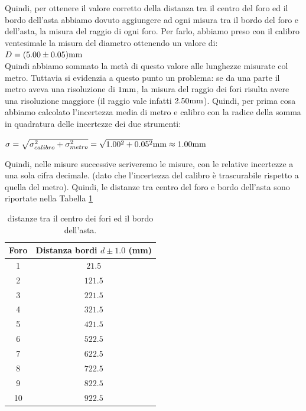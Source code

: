 \documentclass[a4paper,12pt]{article}
\begin{document}
Quindi, per ottenere il valore corretto della distanza tra il centro del foro ed il bordo dell'asta abbiamo dovuto aggiungere ad ogni misura tra il bordo del foro e dell'asta, la misura del raggio di ogni foro. Per farlo, abbiamo preso con il calibro ventesimale la misura del diametro ottenendo un valore di:\\
$D=(5.00\pm0.05)\rm mm$\\
Quindi abbiamo sommato la metà di questo valore alle lunghezze misurate col metro. Tuttavia si evidenzia a questo punto un problema: se da una parte il metro aveva una risoluzione di $1\rm mm$, la misura del raggio dei fori risulta avere una risoluzione maggiore (il raggio vale infatti $2.50\rm mm$). Quindi, per prima cosa abbiamo calcolato l'incertezza media di metro e calibro con la radice della somma in quadratura delle incertezze dei due strumenti:
\begin{center}
    $\sigma =\sqrt{\sigma_{calibro}^2+\sigma_{metro}^2}=\sqrt{1.00^2+0.05^2}\rm mm\approx1.00mm$
\end{center}
Quindi, nelle misure successive scriveremo le misure, con le relative incertezze a una sola cifra decimale. (dato che l'incertezza del calibro è trascurabile rispetto a quella del metro).
Quindi, le distanze tra centro del foro e bordo dell'asta sono riportate nella Tabella \ref{misure centro bordo}\\%

\begin{table}[h!]
\centering
\begin{tabular}{c|c}
     \toprule
     Foro  & Distanza bordi $d\pm 1.0$ (mm) \\
     \midrule
    1 & $21.5 $\\
    2 & $121.5$\\
    3 & $221.5$\\
    4 & $321.5$\\
    5 & $421.5$\\
    6 & $522.5$\\
    7 & $622.5$\\
    8 & $722.5$\\
    9 & $822.5$\\
    10 & $922.5$\\
     \bottomrule
  \end{tabular}
  \caption{distanze tra il centro dei fori ed il bordo dell'asta.}
\label{misure centro bordo}
\end{table}
\end{document}
